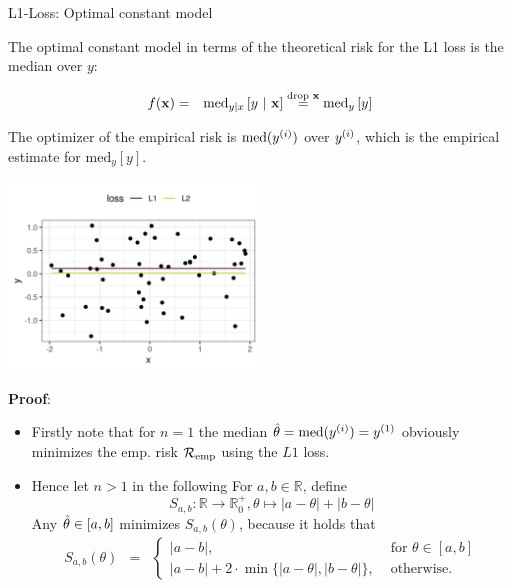 \documentclass[11pt,compress,t,notes=noshow, xcolor=table]{beamer}
\begin{document}
\begin{vbframe}{L1-Loss: Optimal constant model}

The optimal constant model in terms of the theoretical risk for the L1 loss is the median over $y$:

\begin{eqnarray*}
  f(\mathbf{x}) &=& \text{med}_{y|x} \left[y ~|~ \mathbf{x} \right] \overset{\text{drop } \mathbf{x}}{=}  \text{med}_{y} \left[y \right]
  \end{eqnarray*} 

The optimizer of the empirical risk is $\text{med}(y^{(i)})$ over $y^{(i)}$, which is the empirical estimate for $\text{med}_{y} \left[y \right]$. 

\vspace*{-0.3cm}

\begin{center}
\includegraphics[width = 0.5\textwidth ]{figure/l1_vs_l2.png} \\
\end{center}


\framebreak 

\textbf{Proof}: 

\begin{itemize}
  \item Firstly note that for $n = 1$ the median $\hat{\theta} = \text{med}(y^{(i)}) = y^{(1)}$ obviously minimizes the emp. risk $\mathcal{R}_{\text{emp}}$ using the $L1$ loss. 



  \item Hence let $n > 1$ in the following For $a,b \in \mathbb{R}$, define 
  $$
    S_{a,b}:\mathbb{R} \rightarrow \mathbb{R}^+_0, \theta \mapsto |a- \theta| + |b-\theta|
  $$
  \vspace*{-0.3cm}
  Any $\hat{\theta} \in [a,b]$ minimizes $S_{a,b}(\theta)$, because it holds that
  \vspace*{-0.0cm}
  \begin{eqnarray*}
  S_{a,b}(\theta) &=& \begin{cases}|a-b| ,& \text{ for } \theta \in [a,b]\\ |a-b| + 2\cdot\min\{|a-\theta|,|b-\theta|\}
  ,& \text{ otherwise. }\end{cases}
  \end{eqnarray*}


\end{itemize}
\end{vbframe}
\end{document}
